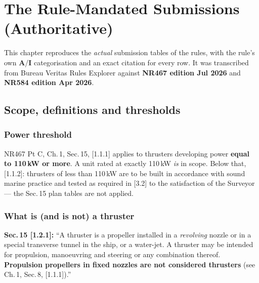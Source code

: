 \documentclass[11pt,a4paper]{report}
\begin{document}
\newpage

\chapter{The Rule-Mandated Submissions (Authoritative)}
\label{ch:ruletables}

This chapter reproduces the \emph{actual} submission tables of the rules, with
the rule's own \textbf{A}/\textbf{I} categorisation and an exact citation for
every row. It was transcribed from Bureau Veritas Rules Explorer against
\textbf{NR467 edition Jul 2026} and \textbf{NR584 edition Apr 2026}.

\noindent{}

\section{Scope, definitions and thresholds}
\label{sec:scope}

\subsection{Power threshold}
NR467 Pt C, Ch.\,1, Sec.\,15, [1.1.1] applies to thrusters developing power
\textbf{equal to 110\,kW or more}. A unit rated at exactly 110\,kW \emph{is}
in scope. Below that, [1.1.2]: thrusters of less than 110\,kW are to be built in
accordance with sound marine practice and tested as required in [3.2] to the
satisfaction of the Surveyor --- the Sec.\,15 plan tables are not applied.

\subsection{What is (and is not) a thruster}
\textbf{Sec.\,15 [1.2.1]:} ``A thruster is a propeller installed in a
\emph{revolving} nozzle or in a special transverse tunnel in the ship, or a
water-jet. A thruster may be intended for propulsion, manoeuvring and steering
or any combination thereof. \textbf{Propulsion propellers in fixed nozzles are
not considered thrusters} (see Ch.\,1, Sec.\,8, [1.1.1]).''
\end{document}
